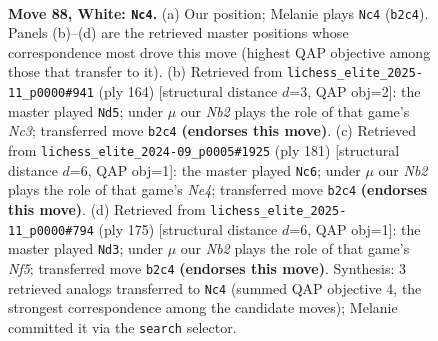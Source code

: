 \documentclass[11pt]{article}
\begin{document}
\clearpage

\begin{figure}[p]\centering
\begin{subfigure}{0.46\textwidth}\centering
\resizebox{\linewidth}{!}{%
\newchessgame
\chessboard[
  setfen={8/3r4/k7/5K2/8/1R6/1N4P1/8 w - - 40 88},
  showmover=false,
  pgfstyle=straightmove, color=movearrow, markmove={b2-c4}
]}
\caption{}
\end{subfigure}\hfill
\begin{subfigure}{0.46\textwidth}\centering
\resizebox{\linewidth}{!}{%
\newchessgame
\chessboard[
  setfen={8/8/1K6/5k2/8/R1N5/8/4r3 w - - 7 83},
  showmover=false,
  pgfstyle=straightmove, color=movearrow, markmove={c3-d5}
]}
\caption{}
\end{subfigure}
\\[4pt]
\begin{subfigure}{0.46\textwidth}\centering
\resizebox{\linewidth}{!}{%
\newchessgame
\chessboard[
  setfen={8/8/8/4n3/4k3/7R/r7/3K4 b - - 69 91},
  showmover=false,
  pgfstyle=straightmove, color=movearrow, markmove={e5-c6}
]}
\caption{}
\end{subfigure}\hfill
\begin{subfigure}{0.46\textwidth}\centering
\resizebox{\linewidth}{!}{%
\newchessgame
\chessboard[
  setfen={4R3/8/8/8/5n2/5k2/7r/K7 b - - 7 88},
  showmover=false,
  pgfstyle=straightmove, color=movearrow, markmove={f4-d3}
]}
\caption{}
\end{subfigure}
\caption{\textbf{Move 88, White: \texttt{Nc4}.} (a) Our position; Melanie plays \texttt{Nc4} (\texttt{b2c4}). Panels (b)--(d) are the retrieved master positions whose correspondence most drove this move (highest QAP objective among those that transfer to it). (b) Retrieved from \texttt{lichess\_elite\_2025-11\_p0000\#941} (ply 164) [structural distance $d$=3, QAP obj=2]: the master played \texttt{Nd5}; under $\mu$ our \emph{Nb2} plays the role of that game's \emph{Nc3}; transferred move \texttt{b2c4} \textbf{(endorses this move)}. (c) Retrieved from \texttt{lichess\_elite\_2024-09\_p0005\#1925} (ply 181) [structural distance $d$=6, QAP obj=1]: the master played \texttt{Nc6}; under $\mu$ our \emph{Nb2} plays the role of that game's \emph{Ne4}; transferred move \texttt{b2c4} \textbf{(endorses this move)}. (d) Retrieved from \texttt{lichess\_elite\_2025-11\_p0000\#794} (ply 175) [structural distance $d$=6, QAP obj=1]: the master played \texttt{Nd3}; under $\mu$ our \emph{Nb2} plays the role of that game's \emph{Nf5}; transferred move \texttt{b2c4} \textbf{(endorses this move)}. Synthesis: 3 retrieved analogs transferred to \texttt{Nc4} (summed QAP objective 4, the strongest correspondence among the candidate moves); Melanie committed it via the \texttt{search} selector.}
\label{fig:thought-m174}
\end{figure}
\end{document}
